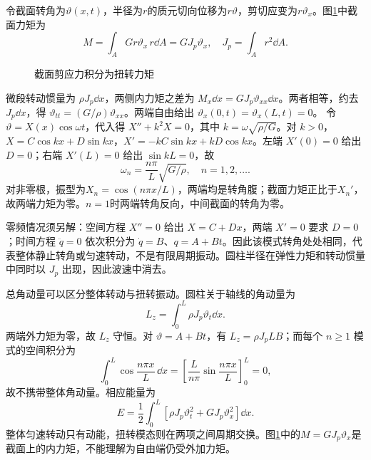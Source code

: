 \begin{solution}
令截面转角为$\vartheta(x,t)$，半径为$r$的质元切向位移为$r\vartheta$，剪切应变为$r\vartheta_x$。图\ref{fig:hw7-2-s}中截面力矩为
\[
 M=\int_A Gr\vartheta_x\,r\dd A=GJ_p\vartheta_x,
 \quad J_p=\int_A r^2\dd A.
\]

\begin{figure}[H]\centering
{}
\caption{截面剪应力积分为扭转力矩}\label{fig:hw7-2-s}
\end{figure}

微段转动惯量为 $\rho J_p\dd x$，两侧内力矩之差为 $M_x\dd x=GJ_p\vartheta_{xx}\dd x$。两者相等，约去 $J_p\dd x$，得 $\vartheta_{tt}=(G/\rho)\vartheta_{xx}$。两端自由给出 $\vartheta_x(0,t)=\vartheta_x(L,t)=0$。
令 $\vartheta=X(x)\cos\omega t$，代入得 $X''+k^2X=0$，其中 $k=\omega\sqrt{\rho/G}$。对 $k>0$，$X=C\cos kx+D\sin kx$，$X'=-kC\sin kx+kD\cos kx$。左端 $X'(0)=0$ 给出 $D=0$；右端 $X'(L)=0$ 给出 $\sin kL=0$，故
\[
 \boxed{\omega_n=\frac{n\pi}{L}\sqrt{G/\rho},\quad n=1,2,\ldots}.
\]
对非零根，振型为$X_n=\cos(n\pi x/L)$，两端均是转角腹；截面力矩正比于$X_n'$，故两端力矩为零。$n=1$时两端转角反向，中间截面的转角为零。

零频情况须另解：空间方程 $X''=0$ 给出 $X=C+Dx$，两端 $X'=0$ 要求 $D=0$；时间方程 $\ddot q=0$ 依次积分为 $\dot q=B$、$q=A+Bt$。因此该模式转角处处相同，代表整体静止转角或匀速转动，不是有限周期振动。圆柱半径在弹性力矩和转动惯量中同时以 $J_p$ 出现，因此波速中消去。


总角动量可以区分整体转动与扭转振动。圆柱关于轴线的角动量为
\[
 L_z=\int_0^L\rho J_p\vartheta_t\dd x.
\]
两端外力矩为零，故 $L_z$ 守恒。对 $\vartheta=A+Bt$，有 $L_z=\rho J_pLB$；而每个 $n\ge1$ 模式的空间积分为
\[
\int_0^L\cos\frac{n\pi x}{L}\,\dd x
=\left[\frac{L}{n\pi}\sin\frac{n\pi x}{L}\right]_0^L=0,
\]
故不携带整体角动量。相应能量为
\[
 E=\frac12\int_0^L[\rho J_p\vartheta_t^2+GJ_p\vartheta_x^2]\dd x.
\]
整体匀速转动只有动能，扭转模态则在两项之间周期交换。图\ref{fig:hw7-2-s}中的$M=GJ_p\vartheta_x$是截面上的内力矩，不能理解为自由端仍受外加力矩。

\end{solution}



